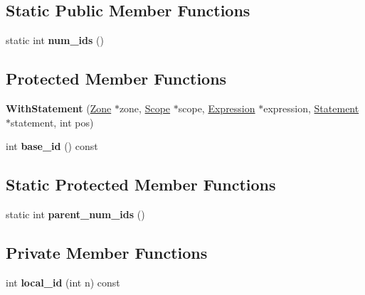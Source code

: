 \subsection*{Static Public Member Functions}
\begin{DoxyCompactItemize}
\item 
static int {\bfseries num\+\_\+ids} ()\hypertarget{classv8_1_1internal_1_1_with_statement_a20b9b38309bab4d0316fed634307fccb}{}\label{classv8_1_1internal_1_1_with_statement_a20b9b38309bab4d0316fed634307fccb}

\end{DoxyCompactItemize}
\subsection*{Protected Member Functions}
\begin{DoxyCompactItemize}
\item 
{\bfseries With\+Statement} (\hyperlink{classv8_1_1internal_1_1_zone}{Zone} $\ast$zone, \hyperlink{classv8_1_1internal_1_1_scope}{Scope} $\ast$scope, \hyperlink{classv8_1_1internal_1_1_expression}{Expression} $\ast$expression, \hyperlink{classv8_1_1internal_1_1_statement}{Statement} $\ast$statement, int pos)\hypertarget{classv8_1_1internal_1_1_with_statement_a8efe0645464fa374bbae22a72e7c2477}{}\label{classv8_1_1internal_1_1_with_statement_a8efe0645464fa374bbae22a72e7c2477}

\item 
int {\bfseries base\+\_\+id} () const \hypertarget{classv8_1_1internal_1_1_with_statement_aded39f121053db000123c3392a512b5a}{}\label{classv8_1_1internal_1_1_with_statement_aded39f121053db000123c3392a512b5a}

\end{DoxyCompactItemize}
\subsection*{Static Protected Member Functions}
\begin{DoxyCompactItemize}
\item 
static int {\bfseries parent\+\_\+num\+\_\+ids} ()\hypertarget{classv8_1_1internal_1_1_with_statement_a7917dac1314cd1a57410da3b20c812b5}{}\label{classv8_1_1internal_1_1_with_statement_a7917dac1314cd1a57410da3b20c812b5}

\end{DoxyCompactItemize}
\subsection*{Private Member Functions}
\begin{DoxyCompactItemize}
\item 
int {\bfseries local\+\_\+id} (int n) const \hypertarget{classv8_1_1internal_1_1_with_statement_a4f82bd224f0a682bcdd3c36567c87c47}{}\label{classv8_1_1internal_1_1_with_statement_a4f82bd224f0a682bcdd3c36567c87c47}

\end{DoxyCompactItemize}
